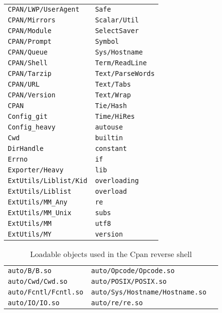 \begin{longtable}{l l}
\texttt{CPAN/LWP/UserAgent} & \texttt{Safe} \\
\texttt{CPAN/Mirrors} & \texttt{Scalar/Util} \\
\texttt{CPAN/Module} & \texttt{SelectSaver} \\
\texttt{CPAN/Prompt} & \texttt{Symbol} \\
\texttt{CPAN/Queue} & \texttt{Sys/Hostname} \\
\texttt{CPAN/Shell} & \texttt{Term/ReadLine} \\
\texttt{CPAN/Tarzip} & \texttt{Text/ParseWords} \\
\texttt{CPAN/URL} & \texttt{Text/Tabs} \\
\texttt{CPAN/Version} & \texttt{Text/Wrap} \\
\texttt{CPAN} & \texttt{Tie/Hash} \\
\texttt{Config\_git} & \texttt{Time/HiRes} \\
\texttt{Config\_heavy} & \texttt{autouse} \\
\texttt{Cwd} & \texttt{builtin} \\
\texttt{DirHandle} & \texttt{constant} \\
\texttt{Errno} & \texttt{if} \\
\texttt{Exporter/Heavy} & \texttt{lib} \\
\texttt{ExtUtils/Liblist/Kid} & \texttt{overloading} \\
\texttt{ExtUtils/Liblist} & \texttt{overload} \\
\texttt{ExtUtils/MM\_Any} & \texttt{re} \\
\texttt{ExtUtils/MM\_Unix} & \texttt{subs} \\
\texttt{ExtUtils/MM} & \texttt{utf8} \\
\texttt{ExtUtils/MY} & \texttt{version} \\
\end{longtable}

\begin{longtable}{l l l}
\caption{Loadable objects used in the Cpan reverse shell}\label{tab:cpan-dpd-so} \\
\texttt{auto/B/B.so} & \texttt{auto/Opcode/Opcode.so} \\
\texttt{auto/Cwd/Cwd.so} & \texttt{auto/POSIX/POSIX.so} \\
\texttt{auto/Fcntl/Fcntl.so} & \texttt{auto/Sys/Hostname/Hostname.so} \\
\texttt{auto/IO/IO.so} & \texttt{auto/re/re.so} \\
\end{longtable}



